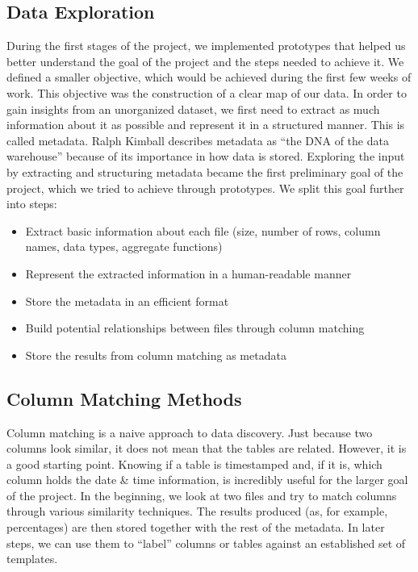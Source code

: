 \subsection{Data Exploration}

During the first stages of the project, we implemented prototypes that helped us better understand the goal of the project
and the steps needed to achieve it.
We defined a smaller objective, which would be achieved during the first few weeks of work.
This objective was the construction of a clear map of our data.
In order to gain insights from an unorganized dataset, we first need to extract as much information about it as possible
and represent it in a structured manner.
This is called metadata.
Ralph Kimball describes metadata as ``the DNA of the data warehouse''\cite{Kimball2008} because of its importance in how data is stored.
Exploring the input by extracting and structuring metadata became the first preliminary goal of the project, which we tried
to achieve through prototypes.
\bigbreak
We split this goal further into steps:
\begin{itemize}
    \item Extract basic information about each file (size, number of rows, column names, data types, aggregate functions)
    \item Represent the extracted information in a human-readable manner
    \item Store the metadata in an efficient format
    \item Build potential relationships between files through column matching
    \item Store the results from column matching as metadata
\end{itemize}

\subsection{Column Matching Methods}

Column matching is a naive approach to data discovery.
Just because two columns look similar, it does not mean that the tables are related.
However, it is a good starting point.
Knowing if a table is timestamped and, if it is, which column holds the date \& time information, is incredibly useful for
the larger goal of the project.
In the beginning, we look at two files and try to match columns through various similarity techniques.
The results produced (as, for example, percentages) are then stored together with the rest of the metadata.
In later steps, we can use them to ``label'' columns or tables against an established set of templates.

